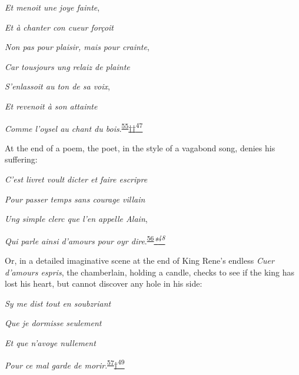 \emph{Et menoit une joye fainte},

\emph{Et à chanter con cueur forçoit}

\emph{Non pas pour plaisir, mais pour crainte},

\emph{Car tousjours ung relaiz de plainte}

\emph{S'enlassoit au ton de sa voix},

\emph{Et revenoit à son attainte}

\emph{Comme l'oysel au chant du
bois}.\textsuperscript{\protect\hypertarget{21_Chapter_Thirteen__IMAGE_AND_WORD.xhtmlux5cux23id_202}{\protect\hyperlink{23_NOTES.xhtmlux5cux23id_203}{55}}}\protect\hypertarget{21_Chapter_Thirteen__IMAGE_AND_WORD.xhtmlux5cux23id_2859}{\protect\hyperlink{23_NOTES.xhtmlux5cux23id_2860}{††\textsuperscript{47}}}

\protect\hypertarget{21_Chapter_Thirteen__IMAGE_AND_WORD.xhtmlux5cux23page_368}{}{}At
the end of a poem, the poet, in the style of a vagabond song, denies his
suffering:

\emph{C'est livret voult dicter et faire escripre}

\emph{Pour passer temps sans courage villain}

\emph{Ung simple clerc que l'en appelle Alain},

\emph{Qui parle ainsi d'amours pour oyr
dire}.\textsuperscript{\protect\hypertarget{21_Chapter_Thirteen__IMAGE_AND_WORD.xhtmlux5cux23id_200}{\protect\hyperlink{23_NOTES.xhtmlux5cux23id_201}{56}}}\emph{\protect\hypertarget{21_Chapter_Thirteen__IMAGE_AND_WORD.xhtmlux5cux23id_2857}{\protect\hyperlink{23_NOTES.xhtmlux5cux23id_2858}{*\textsuperscript{48}}}}

Or, in a detailed imaginative scene at the end of King Rene's endless
\emph{Cuer d'amours espris}, the chamberlain, holding a candle, checks
to see if the king has lost his heart, but cannot discover any hole in
his side:

\emph{Sy me dist tout en soubzriant}

\emph{Que je dormisse seulement}

\emph{Et que n'avoye nullement}

\emph{Pour ce mal garde de
morir}.\textsuperscript{\protect\hypertarget{21_Chapter_Thirteen__IMAGE_AND_WORD.xhtmlux5cux23id_198}{\protect\hyperlink{23_NOTES.xhtmlux5cux23id_199}{57}}}\protect\hypertarget{21_Chapter_Thirteen__IMAGE_AND_WORD.xhtmlux5cux23id_2855}{\protect\hyperlink{23_NOTES.xhtmlux5cux23id_2856}{†\textsuperscript{49}}}

